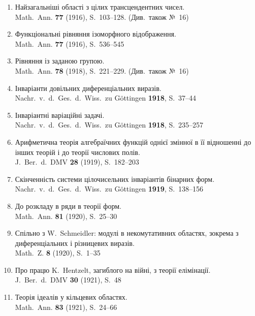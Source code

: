 \documentclass[11pt]{article}
\newcommand{\foreign}[1]{#1}
\begin{document}
\begin{enumerate}[label={\small\arabic*.},leftmargin=2em,itemsep=0.3em]
\item Найзагальніші області з цілих трансцендентних чисел.\\
\foreign{Math.\ Ann.} \textbf{77} (1916), S.~103--128. (Див.\ також №~16)

\item Функціональні рівняння ізоморфного відображення.\\
\foreign{Math.\ Ann.} \textbf{77} (1916), S.~536--545

\item Рівняння із заданою групою.\\
\foreign{Math.\ Ann.} \textbf{78} (1918), S.~221--229. (Див.\ також №~16)

\item Інваріанти довільних диференціальних виразів.\\
\foreign{Nachr.\ v.\ d.\ Ges.\ d.\ Wiss.\ zu Göttingen} \textbf{1918}, S.~37--44

\item Інваріантні варіаційні задачі.\\
\foreign{Nachr.\ v.\ d.\ Ges.\ d.\ Wiss.\ zu Göttingen} \textbf{1918}, S.~235--257

\item Арифметична теорія алгебраїчних функцій однієї змінної в її відношенні до інших теорій і до теорії числових полів.\\
\foreign{J.\ Ber.\ d.\ DMV} \textbf{28} (1919), S.~182--203

\item Скінченність системи цілочисельних інваріантів бінарних форм.\\
\foreign{Nachr.\ v.\ d.\ Ges.\ d.\ Wiss.\ zu Göttingen} \textbf{1919}, S.~138--156

\item До розкладу в ряди в теорії форм.\\
\foreign{Math.\ Ann.} \textbf{81} (1920), S.~25--30

\item Спільно з W.\ Schmeidler: модулі в некомутативних областях, зокрема з диференціальних і різницевих виразів.\\
\foreign{Math.\ Z.} \textbf{8} (1920), S.~1--35

\item Про працю K.\ Hentzelt, загиблого на війні, з теорії елімінації.\\
\foreign{J.\ Ber.\ d.\ DMV} \textbf{30} (1921), S.~48

\item Теорія ідеалів у кільцевих областях.\\
\foreign{Math.\ Ann.} \textbf{83} (1921), S.~24--66


\end{enumerate}
\end{document}
